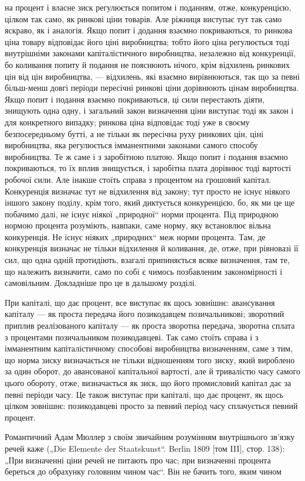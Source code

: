\parcont{}  %
на процент і власне зиск регулюється попитом і поданням, отже,
конкуренцією, цілком так само, як ринкові ціни товарів. Але ріжниця
виступає тут так само яскраво, як і аналогія. Якщо попит
і додання взаємно покриваються, то ринкова ціна товару відповідає
його ціні виробництва; тобто його ціна регулюється тоді
внутрішніми законами капіталістичного виробництва, незалежно
від конкуренції, бо коливання попиту й подання не пояснюють
нічого, крім відхилень ринкових цін від цін виробництва, — відхилень,
які взаємно вирівнюються, так що за певні більш-менш довгі
періоди пересічні ринкові ціни дорівнюють цінам виробництва.
Якщо попит і подання взаємно покриваються, ці сили перестають
діяти, знищують одна одну, і загальний закон визначення ціни
виступає тоді як закон і для конкретного випадку; ринкова ціна
відповідає тоді уже в своєму безпосередньому бутті, а не тільки
як пересічна руху ринкових цін, ціні виробництва, яка регулюється
імманентними законами самого способу виробництва.
Те ж саме і з заробітною платою. Якщо попит і подання взаємно
покриваються, то їх вплив знищується, і заробітна плата дорівнює
тоді вартості робочої сили. Але інакше стоїть справа з процентом
на грошовий капітал. Конкуренція визначає тут не відхилення
від закону; тут просто не існує ніякого іншого закону поділу,
крім того, який диктується конкуренцією, бо, як ми це ще
побачимо далі, не існує ніякої „природної“ норми процента. Під
природною нормою процента розуміють, навпаки, саме норму,
яку встановлює вільна конкуренція. Не існує ніяких „природних“
меж норми процента. Там, де конкуренція визначає не тільки відхилення
й коливання, де, отже, при рівновазі її сил, що одна одній
протидіють, взагалі припиняється всяке визначення, там те, що
належить визначити, само по собі є чимось позбавленим закономірності
і самовільним. Докладніше про це в дальшому розділі.

При капіталі, що дає процент, все виступає як щось зовнішнє:
авансування капіталу — як проста передача його позикодавцем
позичальникові; зворотний приплив реалізованого капіталу — як
проста зворотна передача, зворотна сплата з процентами позичальником
позикодавцеві. Так само стоїть справа і з імманентним
капіталістичному способові виробництва визначенням, саме з тим,
що норма зиску визначається не тільки відношенням того зиску,
який вироблено за один оборот, до авансованої капітальної вартості,
але й тривалістю часу самого цього обороту, отже, визначається
як зиск, що його промисловий капітал дає за певні
періоди часу. Це також виступає при капіталі, що дає процент,
як щось цілком зовнішнє: позикодавцеві просто за певний період
часу сплачується певний процент.

Романтичний Адам Мюллер з своїм звичайним розумінням
внутрішнього зв’язку речей каже („Die Elemente der Staatskunst“.
Berlin 1809 [том III], стор. 138): „При визначенні ціни речей не
питають про час; при визначенні процента береться до обрахунку
головним чином час“. Він не бачить того, яким чином
\parbreak{}  %
